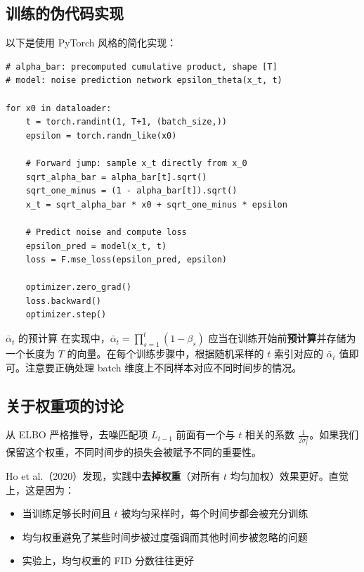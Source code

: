 \documentclass[a4paper]{article}
\begin{document}
\subsection{训练的伪代码实现}

以下是使用 PyTorch 风格的简化实现：

\begin{lstlisting}[caption={DDPM 训练的核心循环}, label=lst:train]
# alpha_bar: precomputed cumulative product, shape [T]
# model: noise prediction network epsilon_theta(x_t, t)

for x0 in dataloader:
    t = torch.randint(1, T+1, (batch_size,))
    epsilon = torch.randn_like(x0)

    # Forward jump: sample x_t directly from x_0
    sqrt_alpha_bar = alpha_bar[t].sqrt()
    sqrt_one_minus = (1 - alpha_bar[t]).sqrt()
    x_t = sqrt_alpha_bar * x0 + sqrt_one_minus * epsilon

    # Predict noise and compute loss
    epsilon_pred = model(x_t, t)
    loss = F.mse_loss(epsilon_pred, epsilon)

    optimizer.zero_grad()
    loss.backward()
    optimizer.step()
\end{lstlisting}

\begin{warningbox}{$\bar{\alpha}_t$ 的预计算}
在实现中，$\bar{\alpha}_t = \prod_{s=1}^{t}(1-\beta_s)$ 应当在训练开始前\textbf{预计算}并存储为一个长度为 $T$ 的向量。在每个训练步骤中，根据随机采样的 $t$ 索引对应的 $\bar{\alpha}_t$ 值即可。注意要正确处理 batch 维度上不同样本对应不同时间步的情况。
\end{warningbox}

\subsection{关于权重项的讨论}

从 ELBO 严格推导，去噪匹配项 $L_{t-1}$ 前面有一个与 $t$ 相关的系数 $\frac{1}{2\sigma_t^2}$。如果我们保留这个权重，不同时间步的损失会被赋予不同的重要性。

Ho et al.（2020）发现，实践中\textbf{去掉权重}（对所有 $t$ 均匀加权）效果更好。直觉上，这是因为：

\begin{itemize}
    \item 当训练足够长时间且 $t$ 被均匀采样时，每个时间步都会被充分训练
    \item 均匀权重避免了某些时间步被过度强调而其他时间步被忽略的问题
    \item 实验上，均匀权重的 FID 分数往往更好
\end{itemize}
\end{document}
